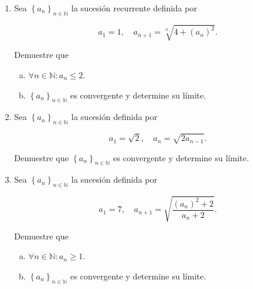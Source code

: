 \documentclass[
	spanish,
	8pt,
	utf8,
	xcolor=table,
	handout,
	aspectratio=169,
	professionalfonts,
	notheorems,
	mathserif,
]{beamer}
\newcounter{savedenum}
\newcommand*{\saveenum}{\setcounter{savedenum}{\theenumi}}
\begin{document}
\begin{frame}
	\begin{enumerate}
		\item
		      Sea $\left\{a_{n}\right\}_{n\in\mathbb{N}}$ la sucesión
		      recurrente definida por

		      \begin{equation*}
			      a_{1}=1,\quad
			      a_{n+1}=\sqrt[3]{4+{\left(a_{n}\right)}^{2}}.
		      \end{equation*}

		      Demuestre que

		      \begin{multicols}{2}
			      \begin{enumerate}[a)]

				      \item

				            $\forall n\in\mathbb{N}:a_{n}\leq2$.

				      \item

				            $\left\{a_{n}\right\}_{n\in\mathbb{N}}$ es
				            convergente y determine su límite.
			      \end{enumerate}
		      \end{multicols}

		\item
		      Sea $\left\{a_{n}\right\}_{n\in\mathbb{N}}$ la sucesión
		      definida por

		      \begin{equation*}
			      a_{1}=\sqrt{2},\quad
			      a_{n}=\sqrt{2a_{n-1}}.
		      \end{equation*}

		      Demuestre que $\left\{a_{n}\right\}_{n\in\mathbb{N}}$ es
		      convergente y determine su límite.

		\item
		      Sea $\left\{a_{n}\right\}_{n\in\mathbb{N}}$ la sucesión
		      definida por

		      \begin{equation*}
			      a_{1}=7,\quad
			      a_{n+1}=\sqrt{\frac{{\left(a_{n}\right)}^{2}+2}{a_{n}+2}}.
		      \end{equation*}

		      Demuestre que

		      \begin{multicols}{2}

			      \begin{enumerate}[a)]
				      \item

				            $\forall n\in\mathbb{N}:a_{n}\geq1$.

				      \item

				            $\left\{a_{n}\right\}_{n\in\mathbb{N}}$ es
				            convergente y determine su límite.
			      \end{enumerate}
		      \end{multicols}

		      \saveenum
	\end{enumerate}
\end{frame}
\end{document}
